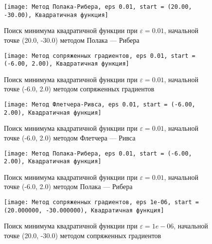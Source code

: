             \begin{figure}[H]
	        \centering
	        \texttt{[image: Метод Полака-Рибера, eps 0.01, start = (20.00, -30.00), Квадратичная функция]}%
	        \caption{Поиск минимума квадратичной функции при $\varepsilon = 0.01$, начальной точке (20.0, -30.0) методом Полака --- Рибера}
	        \vspace*{-1.2cm}
            \end{figure}
            
            \begin{figure}[H]
	        \centering
	        \texttt{[image: Метод сопряженных градиентов, eps 0.01, start = (-6.00, 2.00), Квадратичная функция]}%
	        \caption{Поиск минимума квадратичной функции при $\varepsilon = 0.01$, начальной точке (-6.0, 2.0) методом сопряженных градиентов}
	        \vspace*{-1.2cm}
            \end{figure}
            
            \begin{figure}[H]
	        \centering
	        \texttt{[image: Метод Флетчера-Ривса, eps 0.01, start = (-6.00, 2.00), Квадратичная функция]}%
	        \caption{Поиск минимума квадратичной функции при $\varepsilon = 0.01$, начальной точке (-6.0, 2.0) методом Флетчера --- Ривса}
	        \vspace*{-1.2cm}
            \end{figure}
            
            \begin{figure}[H]
	        \centering
	        \texttt{[image: Метод Полака-Рибера, eps 0.01, start = (-6.00, 2.00), Квадратичная функция]}%
	        \caption{Поиск минимума квадратичной функции при $\varepsilon = 0.01$, начальной точке (-6.0, 2.0) методом Полака --- Рибера}
	        \vspace*{-1.2cm}
            \end{figure}
            
            \begin{figure}[H]
	        \centering
	        \texttt{[image: Метод сопряженных градиентов, eps 1e-06, start = (20.000000, -30.000000), Квадратичная функция]}%
	        \caption{Поиск минимума квадратичной функции при $\varepsilon = 1e-06$, начальной точке (20.0, -30.0) методом сопряженных градиентов}
	        \vspace*{-1.2cm}
            \end{figure}
            
